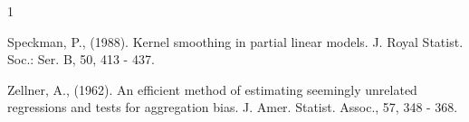 \documentclass{article}
\begin{document}
\begin{thebibliography}{1}




	
Speckman, P., (1988).  Kernel smoothing in partial linear
models. J. Royal Statist. Soc.: Ser. B, 50, 413 - 437.
		

Zellner, A., (1962). An efficient method of estimating
seemingly unrelated regressions and tests for aggregation bias.
J. Amer. Statist. Assoc., 57, 348 - 368.


\end{thebibliography}
\end{document}
